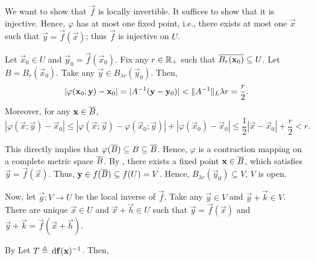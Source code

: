 \documentclass[../MAS242_Note.tex]{subfiles}
\begin{document}
{    We want to show that \(\vec f\) is locally invertible.
    It suffices to show that it is injective.
    Hence, \(\varphi\) has at most one fixed point,
    i.e., there exists at most one \(\vec x\) such that \(\vec y = \vec f(\vec x)\);
    thus \(\vec f\) is injective on \(U\).

    Let \(\vec x_0 \in U\) and \(\vec y_0 = \vec f (\vec x_0)\).
    Fix any \(r \in \RR_+\) such that \(\overline{B_r(\mathbf{x}_0)} \subseteq U\).
    Let \(B = B_r(\vec x_0)\).
    Take any \(\vec y \in B_{\lambda r}(\vec y_0)\).
    Then, \[
        |\varphi(\mathbf{x}_0; \mathbf{y}) - \mathbf{x}_0|
        = |A^{-1}(\mathbf{y} - \mathbf{y}_0)| < \|A^{-1}\|_L \lambda r = \frac{r}{2}\text{.}
    \]
    Moreover, for any \(\mathbf{x} \in \overline B\), \[
        |\varphi(\vec x; \vec y) - \vec x_0|
        \le |\varphi(\vec x; \vec y) - \varphi(\vec x_0; \vec y)| + |\varphi(\vec x_0) - \vec x_0|
        \le \frac{1}{2} |\vec x - \vec x_0| + \frac{r}{2} < r\text{.}
    \]

    This directly implies that \(\varphi(\overline B) \subseteq B \subseteq \overline B\).
    Hence, \(\varphi\) is a contraction mapping on a complete metric space \(\overline B\).
    By , there exists a fixed point \(\mathbf{x} \in \overline B\),
    which satisfies \(\vec y = \vec f(\vec x)\).
    Thus, \(\mathbf{y} \in f(\overline B) \subseteq f(U) = V\). Hence, \(B_{\lambda r}(\vec y_0) \subseteq V\), \(V\) is open.

    Now, let \(\vec g \colon V \to U\) be the local inverse of \(\vec f\).
    Take any \(\vec y \in V\) and \(\vec y + \vec k \in V\).
    There are unique \(\vec x \in U\) and \(\vec x + \vec h \in U\) such that
    \(\vec y = \vec f(\vec x)\) and \(\vec y + \vec k = \vec f(\vec x + \vec h)\).

    By 
    Let \(T \triangleq \,\mathrm{d}\mathbf{f}(\mathbf{x})^{-1}\).
    Then,
    \[
        
    \]
}
\end{document}
